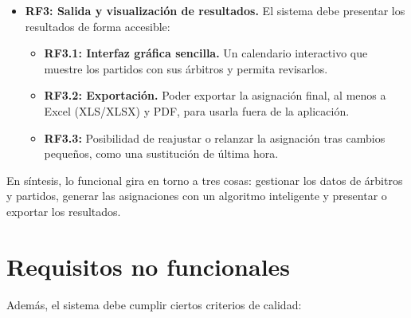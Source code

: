 \documentclass[11pt,a4paper,spanish]{book}
\numberwithin{equation}{chapter}
\numberwithin{figure}{chapter}
\numberwithin{table}{chapter}
\begin{document}
\begin{itemize}
\begin{itemize}
    \end{itemize}
\item {\bf RF3: Salida y visualización de resultados.} El sistema debe presentar los resultados de forma accesible:
    \begin{itemize}
    \item {\bf RF3.1: Interfaz gráfica sencilla.} Un calendario interactivo que muestre los partidos con sus árbitros y permita revisarlos.
    \item {\bf RF3.2: Exportación.} Poder exportar la asignación final, al menos a Excel (XLS/XLSX) y PDF, para usarla fuera de la aplicación.
    \item {\bf RF3.3:} Posibilidad de reajustar o relanzar la asignación tras cambios pequeños, como una sustitución de última hora.
    \end{itemize}
\end{itemize}

En síntesis, lo funcional gira en torno a tres cosas: gestionar los datos de árbitros y partidos, generar las asignaciones con un algoritmo inteligente y presentar o exportar los resultados.

\section{Requisitos no funcionales}

Además, el sistema debe cumplir ciertos criterios de calidad:
\end{document}
